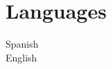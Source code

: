 \documentclass[]{plushcv}
\begin{document}
\begin{minipage}[t]{0.25\textwidth}

\section{Languages}
Spanish \\
\sectionsep
{}
English \\
\sectionsep







\end{minipage}
\end{document}
